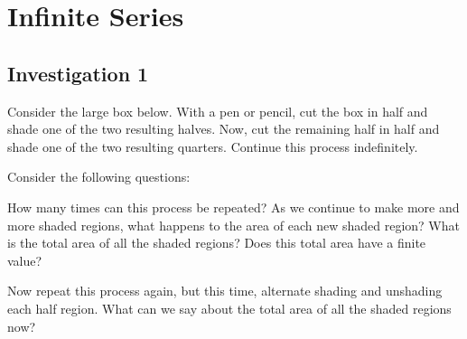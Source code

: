 \documentclass[addpoints]{exam}
\begin{document}
\section*{Infinite Series}
\subsection*{Investigation 1}
Consider the large box below. With a pen or pencil, cut the box in half and shade one of the two resulting halves. Now, cut the remaining half in half and shade one of the two resulting quarters. Continue this process indefinitely. 
\begin{center}
\end{center}
Consider the following questions:
\begin{questions}
    \question How many times can this process be repeated?
    \question As we continue to make more and more shaded regions, what happens to the area of each new shaded region?
    \question What is the total area of all the shaded regions? Does this total area have a finite value?
\end{questions}


\noindent Now repeat this process again, but this time, alternate shading and unshading each half region. What can we say about the total area of all the shaded regions now?
\begin{center}
\end{center}
\end{document}
